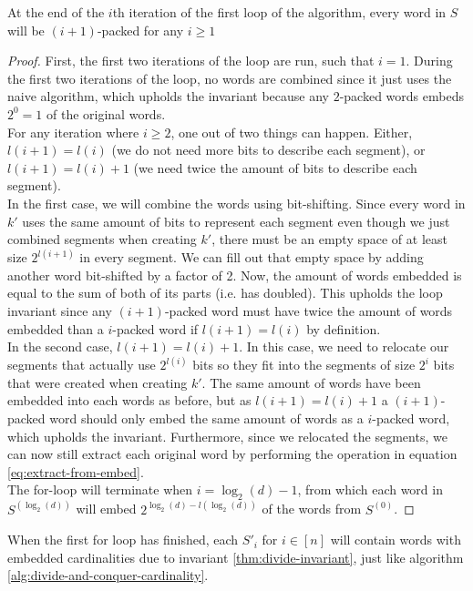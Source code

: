 \begin{invariant}
    At the end of the $i$th iteration of the first loop of the algorithm, every word in $S$ will be $(i+1)$-packed for any $i \geq 1$
\end{invariant}
\begin{proof}
    First, the first two iterations of the loop are run, such that $i=1$. During the first two iterations of the loop, no words are combined since it just uses the naive algorithm, which upholds the invariant because any $2$-packed words embeds $2^{0}=1$ of the original words.\\
    For any iteration where $i\geq 2$, one out of two things can happen. Either, $l(i+1) = l(i)$ (we do not need more bits to describe each segment), or $l(i + 1) = l(i) + 1$ (we need twice the amount of bits to describe each segment).\\
    In the first case, we will combine the words using bit-shifting. Since every word in $k'$ uses the same amount of bits to represent each segment even though we just combined segments when creating $k'$, there must be an empty space of at least size $2^{l(i+1)}$ in every segment. We can fill out that empty space by adding another word bit-shifted by a factor of 2.
    Now, the amount of words embedded is equal to the sum of both of its parts (i.e. has doubled). This upholds the loop invariant since any $(i+1)$-packed word must have twice the amount of words embedded than a $i$-packed word if $l(i+1) = l(i)$ by definition.\\
    In the second case, $l(i + 1) = l(i) + 1$. In this case, we need to relocate our segments that actually use $2^{l(i)}$ bits so they fit into the segments of size $2^i$ bits that were created when creating $k'$.
    The same amount of words have been embedded into each words as before, but as $l(i+1) = l(i) + 1$ a $(i+1)$-packed word should only embed the same amount of words as a $i$-packed word, which upholds the invariant.
    Furthermore, since we relocated the segments, we can now still extract each original word by performing the operation in equation \ref{eq:extract-from-embed}.\\
    The for-loop will terminate when $i = \log_2(d) - 1$, from which each word in $S^{(\log_2(d))}$ will embed $2^{\log_2(d)-l(\log_2(d))}$ of the words from $S^{(0)}$.
\end{proof}
When the first for loop has finished, each $S'_i$ for $i\in [n]$ will contain words with embedded cardinalities due to invariant \ref{thm:divide-invariant}, just like algorithm \ref{alg:divide-and-conquer-cardinality}.

